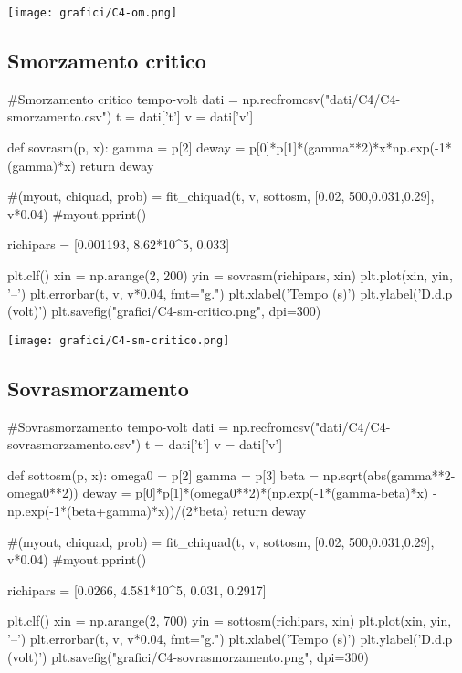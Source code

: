 \begin{center}
 \texttt{[image: grafici/C4-om.png]}
\end{center}
\subsection{Smorzamento critico}

\begin{sagesilent}

#Smorzamento critico tempo-volt
dati = np.recfromcsv("dati/C4/C4-smorzamento.csv")
t = dati['t']
v = dati['v']

def sovrasm(p, x):
  gamma = p[2]
  deway = p[0]*p[1]*(gamma**2)*x*np.exp(-1*(gamma)*x)
  return deway
  
#(myout, chiquad, prob) = fit_chiquad(t, v, sottosm, [0.02, 500,0.031,0.29], v*0.04)
#myout.pprint()

richipars = [0.001193, 8.62*10^5, 0.033]

plt.clf()
xin = np.arange(2, 200)
yin = sovrasm(richipars, xin)
plt.plot(xin, yin, '--')
plt.errorbar(t, v, v*0.04, fmt="g.")
plt.xlabel('Tempo (s)')
plt.ylabel('D.d.p (volt)')
plt.savefig("grafici/C4-sm-critico.png", dpi=300)
\end{sagesilent}


\begin{center}
\texttt{[image: grafici/C4-sm-critico.png]}
\end{center}

\subsection{Sovrasmorzamento}
\begin{sagesilent}
#Sovrasmorzamento tempo-volt
dati = np.recfromcsv("dati/C4/C4-sovrasmorzamento.csv")
t = dati['t']
v = dati['v']

def sottosm(p, x):
  omega0 = p[2]
  gamma = p[3]
  beta = np.sqrt(abs(gamma**2-omega0**2))
  deway = p[0]*p[1]*(omega0**2)*(np.exp(-1*(gamma-beta)*x) - np.exp(-1*(beta+gamma)*x))/(2*beta)
  return deway
  
#(myout, chiquad, prob) = fit_chiquad(t, v, sottosm, [0.02, 500,0.031,0.29], v*0.04)
#myout.pprint()

richipars = [0.0266, 4.581*10^5, 0.031, 0.2917]

plt.clf()
xin = np.arange(2, 700)
yin = sottosm(richipars, xin)
plt.plot(xin, yin, '--')
plt.errorbar(t, v, v*0.04, fmt="g.")
plt.xlabel('Tempo (s)')
plt.ylabel('D.d.p (volt)')
plt.savefig("grafici/C4-sovrasmorzamento.png", dpi=300)
\end{sagesilent}

